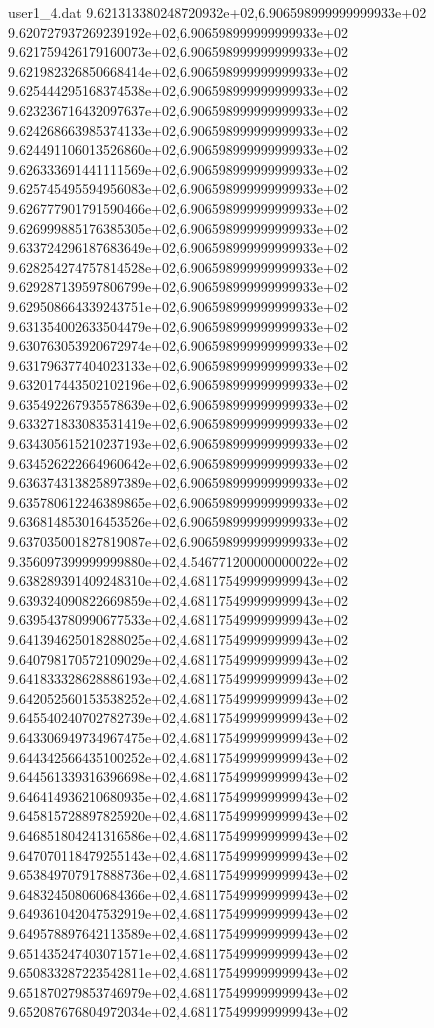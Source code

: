 \begin{filecontents}{user1_4.dat}
9.621313380248720932e+02,6.906598999999999933e+02
9.620727937269239192e+02,6.906598999999999933e+02
9.621759426179160073e+02,6.906598999999999933e+02
9.621982326850668414e+02,6.906598999999999933e+02
9.625444295168374538e+02,6.906598999999999933e+02
9.623236716432097637e+02,6.906598999999999933e+02
9.624268663985374133e+02,6.906598999999999933e+02
9.624491106013526860e+02,6.906598999999999933e+02
9.626333691441111569e+02,6.906598999999999933e+02
9.625745495594956083e+02,6.906598999999999933e+02
9.626777901791590466e+02,6.906598999999999933e+02
9.626999885176385305e+02,6.906598999999999933e+02
9.633724296187683649e+02,6.906598999999999933e+02
9.628254274757814528e+02,6.906598999999999933e+02
9.629287139597806799e+02,6.906598999999999933e+02
9.629508664339243751e+02,6.906598999999999933e+02
9.631354002633504479e+02,6.906598999999999933e+02
9.630763053920672974e+02,6.906598999999999933e+02
9.631796377404023133e+02,6.906598999999999933e+02
9.632017443502102196e+02,6.906598999999999933e+02
9.635492267935578639e+02,6.906598999999999933e+02
9.633271833083531419e+02,6.906598999999999933e+02
9.634305615210237193e+02,6.906598999999999933e+02
9.634526222664960642e+02,6.906598999999999933e+02
9.636374313825897389e+02,6.906598999999999933e+02
9.635780612246389865e+02,6.906598999999999933e+02
9.636814853016453526e+02,6.906598999999999933e+02
9.637035001827819087e+02,6.906598999999999933e+02
9.356097399999999880e+02,4.546771200000000022e+02
9.638289391409248310e+02,4.681175499999999943e+02
9.639324090822669859e+02,4.681175499999999943e+02
9.639543780990677533e+02,4.681175499999999943e+02
9.641394625018288025e+02,4.681175499999999943e+02
9.640798170572109029e+02,4.681175499999999943e+02
9.641833328628886193e+02,4.681175499999999943e+02
9.642052560153538252e+02,4.681175499999999943e+02
9.645540240702782739e+02,4.681175499999999943e+02
9.643306949734967475e+02,4.681175499999999943e+02
9.644342566435100252e+02,4.681175499999999943e+02
9.644561339316396698e+02,4.681175499999999943e+02
9.646414936210680935e+02,4.681175499999999943e+02
9.645815728897825920e+02,4.681175499999999943e+02
9.646851804241316586e+02,4.681175499999999943e+02
9.647070118479255143e+02,4.681175499999999943e+02
9.653849707917888736e+02,4.681175499999999943e+02
9.648324508060684366e+02,4.681175499999999943e+02
9.649361042047532919e+02,4.681175499999999943e+02
9.649578897642113589e+02,4.681175499999999943e+02
9.651435247403071571e+02,4.681175499999999943e+02
9.650833287223542811e+02,4.681175499999999943e+02
9.651870279853746979e+02,4.681175499999999943e+02
9.652087676804972034e+02,4.681175499999999943e+02

\end{filecontents}
